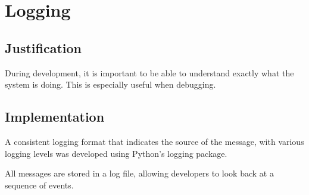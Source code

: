 \section{Logging}

\subsection{Justification}
During development, it is important to be able to understand exactly what the system is doing. This is especially useful when debugging. 

\subsection{Implementation}
A consistent logging format that indicates the source of the message, with various logging levels was developed using Python's logging package.

All messages are stored in a log file, allowing developers to look back at a sequence of events.